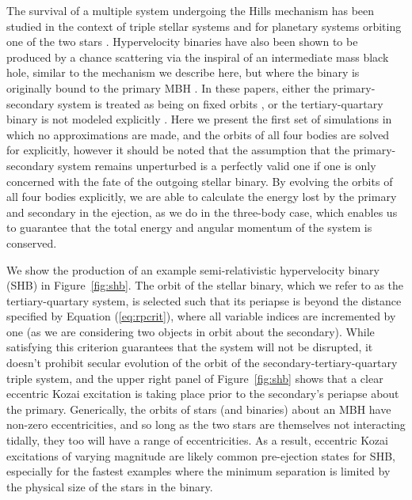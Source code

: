 \documentclass[a4paper,twocolumn]{emulateapj}
\begin{document}
{The survival of a multiple system undergoing the Hills mechanism has been studied in the context of triple stellar systems \citep{Perets:2009c} and for planetary systems orbiting one of the two stars \citep{Ginsburg:2012a}. Hypervelocity binaries have also been shown to be produced by a chance scattering via the inspiral of an intermediate mass black hole, similar to the mechanism we describe here, but where the binary is originally bound to the primary MBH \citep{Levin:2006a,Lu:2007a,Sesana:2009a}. In these papers, either the primary-secondary system is treated as being on fixed orbits \citep{Lu:2007a}, or the tertiary-quartary binary is not modeled explicitly \citep{Sesana:2009a}. Here we present the first set of simulations in which no approximations are made, and the orbits of all four bodies are solved for explicitly, however it should be noted that the assumption that the primary-secondary system remains unperturbed is a perfectly valid one if one is only concerned with the fate of the outgoing stellar binary. By evolving the orbits of all four bodies explicitly, we are able to calculate the energy lost by the primary and secondary in the ejection, as we do in the three-body case, which enables us to guarantee that the total energy and angular momentum of the system is conserved.

We show the production of an example semi-relativistic hypervelocity binary (SHB) in Figure~\ref{fig:shb}. The orbit of the stellar binary, which we refer to as the tertiary-quartary system, is selected such that its periapse is beyond the distance specified by Equation (\ref{eq:rpcrit}), where all variable indices are incremented by one (as we are considering two objects in orbit about the secondary). While satisfying this criterion guarantees that the system will not be disrupted, it doesn't prohibit secular evolution of the orbit of the secondary-tertiary-quartary triple system, and the upper right panel of Figure~\ref{fig:shb} shows that a clear eccentric Kozai excitation \citep{Kozai:1962a,Lithwick:2011a,Naoz:2013a,Li:2014a} is taking place prior to the secondary's periapse about the primary. Generically, the orbits of stars (and binaries) about an MBH have non-zero eccentricities, and so long as the two stars are themselves not interacting tidally, they too will have a range of eccentricities. As a result, eccentric Kozai excitations of varying magnitude are likely common pre-ejection states for SHB, especially for the fastest examples where the minimum separation is limited by the physical size of the stars in the binary.

}
\end{document}

